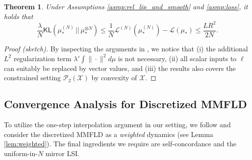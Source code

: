 \documentclass{article}
\newtheorem{theorem}{Theorem}[section]
\newtheorem{assumption}{Assumption}
\newcommand{\sep}[0]{\,||\,}
\newcommand{\KL}[0]{\mathsf{KL}}
\begin{document}
\begin{theorem}\label{thm:poc}
    Under Assumptions \ref{asmp:rel_lip_and_smooth} and \ref{asmp:loss}, it holds that \[
    \frac{\lambda}{N}{\KL(\mu_*^{(N)}\sep\mu_*^{\otimes N})}\le \frac{1}{N}\mathcal{L}^{(N)}(\mu_*^{(N)}) - \mathcal{L}(\mu_*) \le \frac{LR^2}{2N}.
    \]
\end{theorem}
\begin{proof}[Proof (sketch)]
    By inspecting the arguments in \citet[Appendix A]{nitanda2024improved}, we notice that (i) the additional $L^2$ regularization term $\lambda' \int\|\cdot\|^2d\mu$ is not necessary, (ii) all scalar inputs to $\ell$ can suitably be replaced by vector values, and (iii) the results also covers the constrained setting $\mathcal{P}_2(\mathcal{X})$ by convexity of $\mathcal{X}$.
\end{proof}

\subsection{Convergence Analysis for Discretized MMFLD}



To utilize the one-step interpolation argument \citep{vempalawibisono} in our setting, we follow \citet{wibisono2019proximal,jiang2021mirror} and consider the discretized MMFLD as a \emph{weighted} dynamics (see Lemma \ref{lem:weighted}). The final ingredients we require are self-concordance and the uniform-in-$N$ mirror LSI.
\end{document}
